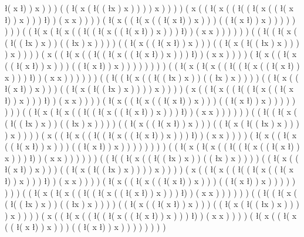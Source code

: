 \l ( x \l ) ) x ) ) ) ( ( \l ( x ( \l ( ( \l x ) x ) ) ) ) x ) ) ) ) ( x ( ( \l ( x ( ( \l ( ( \l ( x ( ( \l ( x \l ) ) x ) ) ) \l ) ) ( x x ) ) ) ) ( \l ( x ( ( \l ( x ( ( \l ( x \l ) ) x ) ) ) ( ( \l ( x \l ) ) x ) ) ) ) ) ) ) ) ( ( \l ( x ( \l ( x ( ( \l ( ( \l ( x ( ( \l ( x \l ) ) x ) ) ) \l ) ) ( x x ) ) ) ) ) ) ( ( \l ( ( \l ( x ( ( \l ( ( \l x ) x ) ) ( ( \l x ) x ) ) ) ) ( ( \l ( x ( ( \l ( x \l ) ) x ) ) ) ( ( \l ( x ( \l ( ( \l x ) x ) ) ) ) x ) ) ) ) ( x ( ( \l ( x ( ( \l ( ( \l ( x ( ( \l ( x \l ) ) x ) ) ) \l ) ) ( x x ) ) ) ) ( \l ( x ( ( \l ( x ( ( \l ( x \l ) ) x ) ) ) ( ( \l ( x \l ) ) x ) ) ) ) ) ) ) ) ( ( \l ( x ( \l ( x ( ( \l ( ( \l ( x ( ( \l ( x \l ) ) x ) ) ) \l ) ) ( x x ) ) ) ) ) ) ( ( \l ( ( \l ( x ( ( \l ( ( \l x ) x ) ) ( ( \l x ) x ) ) ) ) ( ( \l ( x ( ( \l ( x \l ) ) x ) ) ) ( ( \l ( x ( \l ( ( \l x ) x ) ) ) ) x ) ) ) ) ( x ( ( \l ( x ( ( \l ( ( \l ( x ( ( \l ( x \l ) ) x ) ) ) \l ) ) ( x x ) ) ) ) ( \l ( x ( ( \l ( x ( ( \l ( x \l ) ) x ) ) ) ( ( \l ( x \l ) ) x ) ) ) ) ) ) ) ) ( ( \l ( x ( \l ( x ( ( \l ( ( \l ( x ( ( \l ( x \l ) ) x ) ) ) \l ) ) ( x x ) ) ) ) ) ) ( ( \l ( ( \l ( x ( ( \l ( ( \l x ) x ) ) ( ( \l x ) x ) ) ) ) ( ( \l ( x ( ( \l ( x \l ) ) x ) ) ) ( ( \l ( x ( \l ( ( \l x ) x ) ) ) ) x ) ) ) ) ( x ( ( \l ( x ( ( \l ( ( \l ( x ( ( \l ( x \l ) ) x ) ) ) \l ) ) ( x x ) ) ) ) ( \l ( x ( ( \l ( x ( ( \l ( x \l ) ) x ) ) ) ( ( \l ( x \l ) ) x ) ) ) ) ) ) ) ) ( ( \l ( x ( \l ( x ( ( \l ( ( \l ( x ( ( \l ( x \l ) ) x ) ) ) \l ) ) ( x x ) ) ) ) ) ) ( ( \l ( ( \l ( x ( ( \l ( ( \l x ) x ) ) ( ( \l x ) x ) ) ) ) ( ( \l ( x ( ( \l ( x \l ) ) x ) ) ) ( ( \l ( x ( \l ( ( \l x ) x ) ) ) ) x ) ) ) ) ( x ( ( \l ( x ( ( \l ( ( \l ( x ( ( \l ( x \l ) ) x ) ) ) \l ) ) ( x x ) ) ) ) ( \l ( x ( ( \l ( x ( ( \l ( x \l ) ) x ) ) ) ( ( \l ( x \l ) ) x ) ) ) ) ) ) ) ) ( ( \l ( x ( \l ( x ( ( \l ( ( \l ( x ( ( \l ( x \l ) ) x ) ) ) \l ) ) ( x x ) ) ) ) ) ) ( ( \l ( ( \l ( x ( ( \l ( ( \l x ) x ) ) ( ( \l x ) x ) ) ) ) ( ( \l ( x ( ( \l ( x \l ) ) x ) ) ) ( ( \l ( x ( \l ( ( \l x ) x ) ) ) ) x ) ) ) ) ( x ( ( \l ( x ( ( \l ( ( \l ( x ( ( \l ( x \l ) ) x ) ) ) \l ) ) ( x x ) ) ) ) ( \l ( x ( ( \l ( x ( ( \l ( x \l ) ) x ) ) ) ( ( \l ( x \l ) ) x ) ) ) ) ) ) ) )